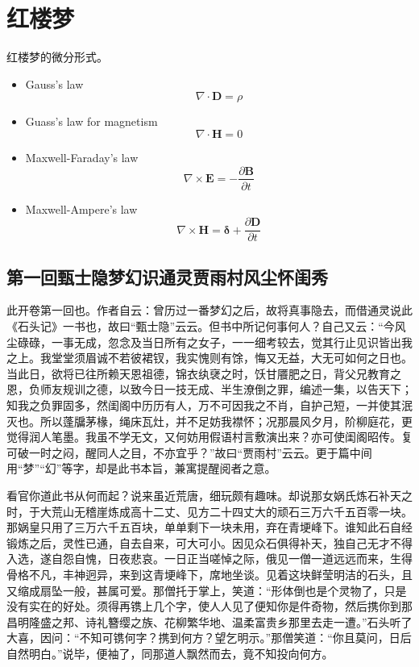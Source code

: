 \chapter{红楼梦}
    红楼梦的微分形式。
    \begin{itemize}
        \item Gauss's law
        \begin{equation}
            \nabla\cdot\mathbf{D}=\rho
        \end{equation}
        \item Guass's law for magnetism
        \begin{equation}
            \nabla\cdot\mathbf{H}=0
        \end{equation}
        \item Maxwell-Faraday's law
        \begin{equation}
            \nabla \times \mathbf{E}=-\frac{\partial \mathbf{B}}{\partial t}
        \end{equation}
        \item Maxwell-Ampere's law
        \begin{equation}
            \nabla \times \mathbf{H}=\mathbf{\delta}+\frac{\partial \mathbf{D}}{\partial t}
        \end{equation}
    \end{itemize}
    \section{第一回\hspace{0.5em}甄士隐梦幻识通灵\hspace{0.5em}贾雨村风尘怀闺秀}
        此开卷第一回也。作者自云：曾历过一番梦幻之后，故将真事隐去，而借通灵说此《石头记》一书也，故曰“甄士隐”云云。但书中所记何事何人？自己又云：“今风尘碌碌，一事无成，忽念及当日所有之女子，一一细考较去，觉其行止见识皆出我之上。我堂堂须眉诚不若彼裙钗，我实愧则有馀，悔又无益，大无可如何之日也。当此日，欲将已往所赖天恩祖德，锦衣纨裦之时，饫甘餍肥之日，背父兄教育之恩，负师友规训之德，以致今日一技无成、半生潦倒之罪，编述一集，以告天下；知我之负罪固多，然闺阁中历历有人，万不可因我之不肖，自护己短，一并使其泯灭也。所以蓬牖茅椽，绳床瓦灶，并不足妨我襟怀；况那晨风夕月，阶柳庭花，更觉得润人笔墨。我虽不学无文，又何妨用假语村言敷演出来？亦可使闺阁昭传。复可破一时之闷，醒同人之目，不亦宜乎？”故曰“贾雨村”云云。更于篇中间用“梦”“幻”等字，却是此书本旨，兼寓提醒阅者之意。

        看官你道此书从何而起？说来虽近荒唐，细玩颇有趣味。却说那女娲氏炼石补天之时，于大荒山无稽崖炼成高十二丈、见方二十四丈大的顽石三万六千五百零一块。那娲皇只用了三万六千五百块，单单剩下一块未用，弃在青埂峰下。谁知此石自经锻炼之后，灵性已通，自去自来，可大可小。因见众石俱得补天，独自己无才不得入选，遂自怨自愧，日夜悲哀。一日正当嗟悼之际，俄见一僧一道远远而来，生得骨格不凡，丰神迥异，来到这青埂峰下，席地坐谈。见着这块鲜莹明洁的石头，且又缩成扇坠一般，甚属可爱。那僧托于掌上，笑道：“形体倒也是个灵物了，只是没有实在的好处。须得再镌上几个字，使人人见了便知你是件奇物，然后携你到那昌明隆盛之邦、诗礼簪缨之族、花柳繁华地、温柔富贵乡那里去走一遭。”石头听了大喜，因问：“不知可镌何字？携到何方？望乞明示。”那僧笑道：“你且莫问，日后自然明白。”说毕，便袖了，同那道人飘然而去，竟不知投向何方。
